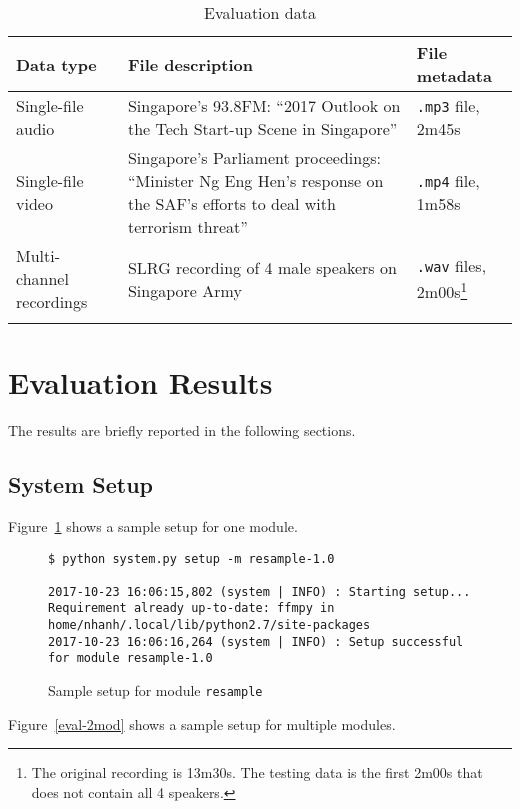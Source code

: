 \begin{longtabu}{X[1,l]X[3,l]X[1,l]}
    \textbf{Data type} &
    \textbf{File description}
    & \textbf{File metadata} \\
    \midrule
    \endhead{}
    Single-file audio & 
    Singapore's 93.8FM\@: ``2017 Outlook on the Tech Start-up Scene
    in Singapore'' &
    \texttt{.mp3} file, 2m45s \\
    Single-file video &
    Singapore's Parliament proceedings: ``Minister Ng Eng Hen's response
    on the SAF's efforts to deal with terrorism threat'' &
    \texttt{.mp4} file, 1m58s \\
    Multi-channel recordings &
    SLRG recording of 4 male speakers on Singapore Army &
    \texttt{.wav} files, 2m00s\footnote{The original recording is 13m30s. The
    testing data is the first 2m00s that does not contain all 4 speakers.} \\
    \caption{Evaluation data}\label{eval-data}
\end{longtabu}

\newpage

\section{Evaluation Results}\label{sec:eval:res}

The results are briefly reported in the following sections.

\subsection{System Setup}

Figure~\ref{eval-1mod} shows a sample setup for one module.

\begin{figure}[ht]
\begin{lstlisting}
$ python system.py setup -m resample-1.0

2017-10-23 16:06:15,802 (system | INFO) : Starting setup...
Requirement already up-to-date: ffmpy in home/nhanh/.local/lib/python2.7/site-packages
2017-10-23 16:06:16,264 (system | INFO) : Setup successful for module resample-1.0
\end{lstlisting}
\caption{Sample setup for module \texttt{resample}}\label{eval-1mod}
\end{figure}

Figure~\ref{eval-2mod} shows a sample setup for multiple modules.


